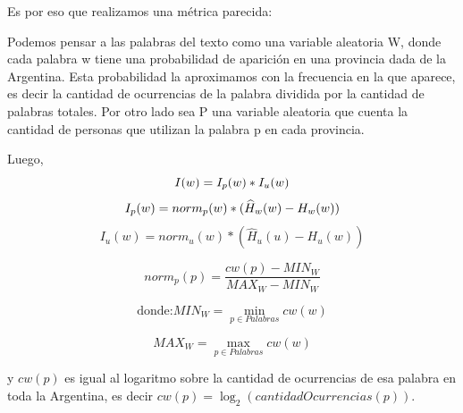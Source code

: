 Es por eso que realizamos una métrica parecida:

Podemos pensar a las palabras del texto como una variable aleatoria W, donde cada palabra w tiene una probabilidad de aparición en una provincia dada de la Argentina. Esta probabilidad la aproximamos con la frecuencia en la que aparece, es decir la cantidad de ocurrencias de la palabra dividida por la cantidad de palabras totales.
Por otro lado sea P una variable aleatoria que cuenta la cantidad de personas que 
utilizan la palabra p en cada provincia.

Luego,
\begin{equation}
I(w) =  I_p(w) * I_u(w)\\
\end{equation}
\begin{equation}
I_p(w) = norm_{p}(w) * (\widehat{H}_{w}(w) - H_{w}(w)) \\
\end{equation}
\begin{equation}
I_u(w) = norm_{u}(w) * (\widehat{H}_{u}(u) - H_{u}(w))
\end{equation}

\begin{equation}
norm_{p}(p) = \frac{cw(p)- MIN_W }{MAX_W - MIN_W}
\label{eq:norm1}
\end{equation}

\noindent\begin{minipage}{.5\linewidth}
\begin{equation}
\text{donde:}  MIN_W = \min\limits_{p \in Palabras} cw(w)
\end{equation}
\end{minipage}%
\begin{minipage}{.5\linewidth}
\begin{equation}
  MAX_W = \max\limits_{p \in Palabras} cw(w)
\end{equation}
\end{minipage}
y $cw(p)$ es igual al logaritmo sobre la cantidad de ocurrencias de esa palabra en toda la Argentina, es decir $cw(p) = \log_2(cantidadOcurrencias(p))$.

